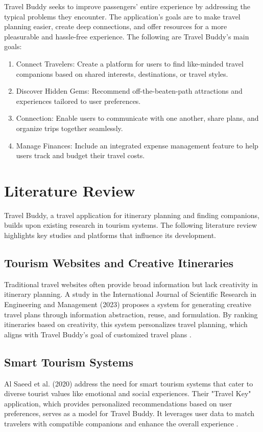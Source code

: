 \documentclass[12pt,a4paper]{report}
\begin{document}
Travel Buddy seeks to improve passengers' entire experience by addressing the typical problems they encounter. The application's goals are to make travel planning easier, create deep connections, and offer resources for a more pleasurable and hassle-free experience. The following are Travel Buddy's main goals:
  \begin{enumerate}
    \item Connect Travelers: Create a platform for users to find like-minded travel companions based on shared interests, destinations, or travel styles.
    \item Discover Hidden Gems: Recommend off-the-beaten-path attractions and experiences tailored to user preferences.
    \item Connection: Enable users to communicate with one another, share plans, and organize trips together seamlessly.
    \item Manage Finances: Include an integrated expense management feature to help users track and budget their travel costs.
\end{enumerate}

\pagebreak
\chapter{Literature Review}
Travel Buddy, a travel application for itinerary planning and finding companions, builds upon existing research in tourism systems. The following literature review highlights key studies and platforms that influence its development.

\section{ Tourism Websites and Creative Itineraries}
Traditional travel websites often provide broad information but lack creativity in itinerary planning. A study in the International Journal of Scientific Research in Engineering and Management (2023) proposes a system for generating creative travel plans through information abstraction, reuse, and formulation. By ranking itineraries based on creativity, this system personalizes travel planning, which aligns with Travel Buddy’s goal of customized travel plans \cite{ijsrem2023}.

\section{ Smart Tourism Systems}
Al Saeed et al. (2020) address the need for smart tourism systems that cater to diverse tourist values like emotional and social experiences. Their "Travel Key" application, which provides personalized recommendations based on user preferences, serves as a model for Travel Buddy. It leverages user data to match travelers with compatible companions and enhance the overall experience \cite{alsaed2020}.
\end{document}
